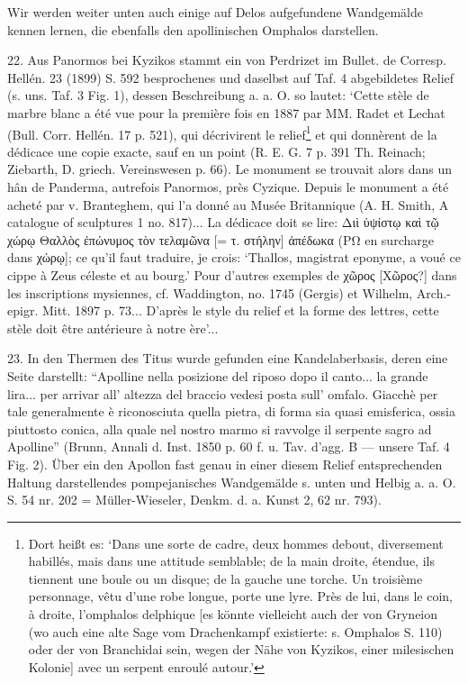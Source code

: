\documentclass[a4paper, 11pt, oneside]{article}
\begin{document}
Wir werden weiter unten auch einige auf Delos aufgefundene Wandgemälde kennen lernen, die ebenfalls den apollinischen Omphalos darstellen.

22. Aus Panormos bei Kyzikos stammt ein von Perdrizet im Bullet. de Corresp. Hellén. 23 (1899) S. 592 besprochenes und daselbst auf Taf. 4 abgebildetes Relief (s. uns. Taf. 3 Fig. 1), dessen Beschreibung a. a. O. so lautet: `Cette stèle de marbre blanc a été vue pour la première fois en 1887 par MM. Radet et Lechat (Bull. Corr. Hellén. 17 p. 521), qui décrivirent le relief\footnote{Dort heißt es: `Dans une sorte de cadre, deux hommes debout, diversement habillés, mais dans une attitude semblable; de la main droite, étendue, ils tiennent une boule ou un disque; de la gauche une torche. Un troisième personnage, vêtu d'une robe longue, porte une lyre. Près de lui, dans le coin, à droite, l'omphalos delphique [es könnte vielleicht auch der von Gryneion (wo auch eine alte Sage vom Drachenkampf existierte: s. Omphalos S. 110) oder der von Branchidai sein, wegen der Nähe von Kyzikos, einer milesischen Kolonie] avec un serpent enroulé autour.'} et qui donnèrent de la dédicace une copie exacte, sauf en un point (R. E. G. 7 p. 391 Th. Reinach; Ziebarth, D. griech. Vereinswesen p. 66). Le monument se trouvait alors dans un hân de Panderma, autrefois Panormos, près Cyzique. Depuis le monument a été acheté par v. Branteghem, qui l'a donné au Musée Britannique (A. H. Smith, A catalogue of sculptures 1 no. 817)... La dédicace doit se lire: Διὶ ὑψίστῳ καὶ τῷ χώρῳ Θαλλὸς ἐπώνυμος τὸν τελαμῶνα [= τ. στήλην] ἀπέδωκα (ΡΩ en surcharge dans χώρῳ]; ce qu'il faut traduire, je crois: `Thallos, magistrat eponyme, a voué ce cippe à Zeus céleste et au bourg.' Pour d'autres exemples de χῶρος [Χῶρος?] dans les inscriptions mysiennes, cf. Waddington, no. 1745 (Gergis) et Wilhelm, Arch.-epigr. Mitt. 1897 p. 73... D'après le style du relief et la forme des lettres, cette stèle doit être antérieure à notre ère'...

23. In den Thermen des Titus wurde gefunden eine Kandelaberbasis, deren eine Seite darstellt: "`Apolline nella posizione del riposo dopo il canto... la grande lira... per arrivar all' altezza del braccio vedesi posta sull' omfalo. Giacchè per tale generalmente è riconosciuta quella pietra, di forma sia quasi emisferica, ossia piuttosto conica, alla quale nel nostro marmo si ravvolge il serpente sagro ad Apolline"' (Brunn, Annali d. Inst. 1850 p. 60 f. u. Tav. d'agg. B --- unsere Taf. 4 Fig. 2). Über ein den Apollon fast genau in einer diesem Relief entsprechenden Haltung darstellendes pompejanisches Wandgemälde s. unten und Helbig a. a. O. S. 54 nr. 202 = Müller-Wieseler, Denkm. d. a. Kunst 2, 62 nr. 793).
\end{document}
